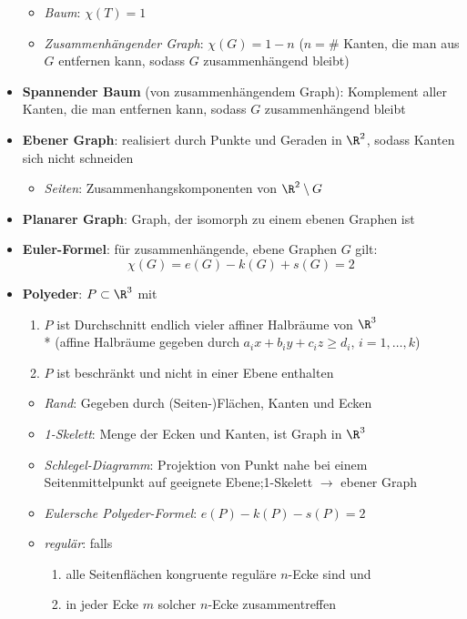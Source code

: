 \begin{itemize}
\begin{itemize}
    \item \emph{Baum}: \( \chi(T) = 1 \)
    \item \emph{Zusammenhängender Graph}: \( \chi(G) = 1-n \) (\( n = \# \) Kanten, die man aus \( G \) entfernen kann, sodass \( G \) zusammenhängend bleibt)
  \end{itemize}
  \item \textbf{Spannender Baum} (von zusammenhängendem Graph): Komplement aller Kanten, die man entfernen kann, sodass \( G \) zusammenhängend bleibt
  \item \textbf{Ebener Graph}: realisiert durch Punkte und Geraden in \( \R^2 \), sodass Kanten sich nicht schneiden
  \begin{itemize}
    \item \emph{Seiten}: Zusammenhangskomponenten von \( \R^2 \setminus G \)
  \end{itemize}
  \item \textbf{Planarer Graph}: Graph, der isomorph zu einem ebenen Graphen ist
  \item \textbf{Euler-Formel}: für zusammenhängende, ebene Graphen \( G \) gilt:
  \begin{equation*}
    \chi(G) = e(G)-k(G)+s(G) = 2
  \end{equation*}
  \item \textbf{Polyeder}: \( P \subset \R^3 \) mit
  \begin{enumerate}
    \item \( P \) ist Durchschnitt endlich vieler affiner Halbräume von \( \R^3 \) \\*
    (affine Halbräume gegeben durch \( a_i x + b_i y + c_i z \geq d_i \), \( i = 1,\dots,k \))
    \item \( P \) ist beschränkt und nicht in einer Ebene enthalten
  \end{enumerate}
  \begin{itemize}
    \item \emph{Rand}: Gegeben durch (Seiten-)Flächen, Kanten und Ecken
    \item \emph{1-Skelett}: Menge der Ecken und Kanten, ist Graph in \( \R^3 \)
    \item \emph{Schlegel-Diagramm}: Projektion von Punkt nahe bei einem Seitenmittelpunkt auf geeignete Ebene;\@ 1-Skelett \( \to \) ebener Graph
    \item \emph{Eulersche Polyeder-Formel}: \( e(P)-k(P)-s(P) = 2 \)
    \item \emph{regulär}: falls
    \begin{enumerate}
      \item alle Seitenflächen kongruente reguläre \( n \)-Ecke sind und
      \item in jeder Ecke \( m \) solcher \( n \)-Ecke zusammentreffen
    \end{enumerate}
  \end{itemize}
\end{itemize}

